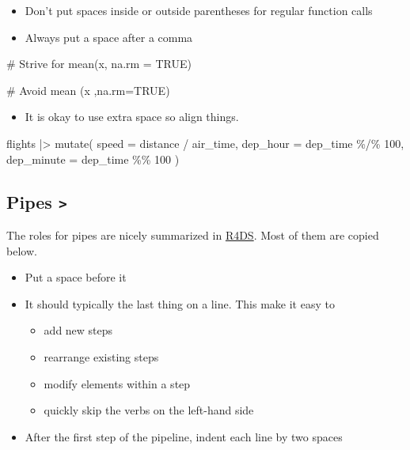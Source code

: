 \documentclass[
  letterpaper,
  DIV=11,
  numbers=noendperiod]{scrreprt}
\newenvironment{Shaded}{\begin{snugshade}}{\end{snugshade}}
\newcommand{\AttributeTok}[1]{\textcolor[rgb]{0.40,0.45,0.13}{#1}}
\newcommand{\CommentTok}[1]{\textcolor[rgb]{0.37,0.37,0.37}{#1}}
\newcommand{\ConstantTok}[1]{\textcolor[rgb]{0.56,0.35,0.01}{#1}}
\newcommand{\DecValTok}[1]{\textcolor[rgb]{0.68,0.00,0.00}{#1}}
\newcommand{\FunctionTok}[1]{\textcolor[rgb]{0.28,0.35,0.67}{#1}}
\newcommand{\NormalTok}[1]{\textcolor[rgb]{0.00,0.23,0.31}{#1}}
\newcommand{\SpecialCharTok}[1]{\textcolor[rgb]{0.37,0.37,0.37}{#1}}
\providecommand{\tightlist}{%
  \setlength{\itemsep}{0pt}\setlength{\parskip}{0pt}}\usepackage{longtable,booktabs,array}
\begin{document}
\begin{itemize}
\tightlist
\item
  Don't put spaces inside or outside parentheses for regular function
  calls
\item
  Always put a space after a comma
\end{itemize}

\begin{Shaded}
\begin{Highlighting}[]
\CommentTok{\# Strive for}
\FunctionTok{mean}\NormalTok{(x, }\AttributeTok{na.rm =} \ConstantTok{TRUE}\NormalTok{)}

\CommentTok{\# Avoid}
\FunctionTok{mean}\NormalTok{ (x ,}\AttributeTok{na.rm=}\ConstantTok{TRUE}\NormalTok{)}
\end{Highlighting}
\end{Shaded}

\begin{itemize}
\tightlist
\item
  It is okay to use extra space so align things.
\end{itemize}

\begin{Shaded}
\begin{Highlighting}[]
\NormalTok{flights }\SpecialCharTok{|\textgreater{}} 
  \FunctionTok{mutate}\NormalTok{(}
    \AttributeTok{speed      =}\NormalTok{ distance }\SpecialCharTok{/}\NormalTok{ air\_time,}
    \AttributeTok{dep\_hour   =}\NormalTok{ dep\_time }\SpecialCharTok{\%/\%} \DecValTok{100}\NormalTok{,}
    \AttributeTok{dep\_minute =}\NormalTok{ dep\_time }\SpecialCharTok{\%\%}  \DecValTok{100}
\NormalTok{  )}
\end{Highlighting}
\end{Shaded}

\subsection{\texorpdfstring{Pipes
\texttt{\textbar{}\textgreater{}}}{Pipes \textbar\textgreater{}}}\label{pipes}

The roles for pipes are nicely summarized in
\href{https://r4ds.hadley.nz/workflow-style\#sec-pipes}{R4DS}. Most of
them are copied below.

\begin{itemize}
\tightlist
\item
  Put a space before it
\item
  It should typically the last thing on a line. This make it easy to

  \begin{itemize}
  \tightlist
  \item
    add new steps
  \item
    rearrange existing steps
  \item
    modify elements within a step
  \item
    quickly skip the verbs on the left-hand side
  \end{itemize}
\item
  After the first step of the pipeline, indent each line by two spaces
\end{itemize}
\end{document}
